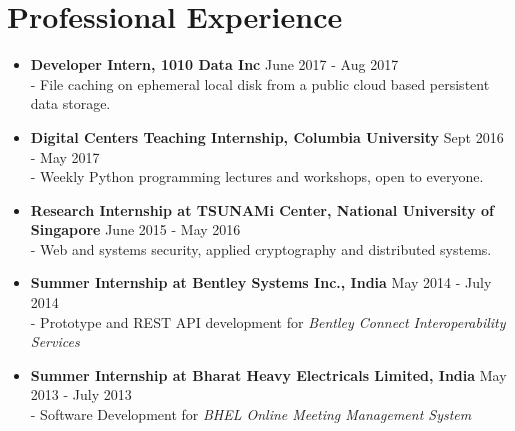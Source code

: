 \documentclass{article}
\begin{document}
\section*{Professional Experience}
\begin{itemize}
    \item \textbf{Developer Intern, 1010 Data Inc} {\hfill June 2017 - Aug 2017}\\
    - File caching on ephemeral local disk from a public cloud based persistent data storage.

    \item \textbf{Digital Centers Teaching Internship, Columbia University} {\hfill Sept 2016 - May 2017}\\
    - Weekly Python programming lectures and workshops, open to everyone.

    \item \textbf{Research Internship at TSUNAMi Center, National University of Singapore} {\hfill June 2015 - May 2016}\\
    - Web and systems security, applied cryptography and distributed systems.
    
    \item \textbf{Summer Internship at Bentley Systems Inc., India} {\hfill May 2014 - July 2014}\\
    - Prototype and REST API development for \textit{Bentley Connect Interoperability Services}

    \item \textbf{Summer Internship at Bharat Heavy Electricals Limited, India} {\hfill May 2013 - July 2013}\\
    - Software Development for \textit{BHEL Online Meeting Management System}
\end{itemize}
\end{document}
